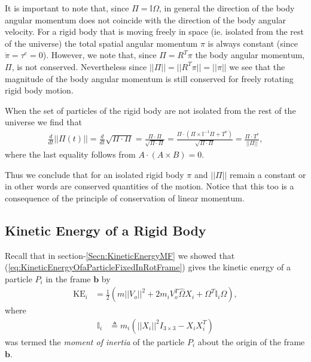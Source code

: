 \documentclass[graybox,envcountchap,sectrefs]{svmonoMuga}
\begin{document}
\begin{svgraybox}
It is important to note that, since $\Pi=\mathbb{I}\Omega$, in general the direction of the body angular momentum does not coincide with the direction of the body angular velocity.
For a rigid body that is moving freely in space (ie. isolated from the rest of the universe) the total spatial angular momentum $\pi$ is always constant (since $\dot{\pi}=\tau^e=0$). However, we note that, since $\Pi=R^T\pi$ the body angular momentum, $\Pi$, is not conserved. Nevertheless since $||\Pi||=||R^T\pi||=||\pi||$ we see that the magnitude of the body angular momentum is still conserved for freely rotating rigid body motion.
\end{svgraybox}
When the set of particles of the rigid body are not isolated from the rest of the universe we find that
\begin{align}\label{eq:RateMagPi}
\frac{d }{dt}||\Pi(t)||=\frac{d}{dt}\sqrt{\Pi \cdot \Pi}=\frac{{\Pi \cdot \dot{\Pi}}}{\sqrt{\Pi \cdot \Pi}}=\frac{{\Pi \cdot (\Pi\times \mathbb{I}^{-1}\Pi+T^e)}}
{\sqrt{\Pi \cdot \Pi}}=\frac{{\Pi \cdot T^e}}{||\Pi||},
\end{align}
where the last equality follows from
$
A \cdot (A \times B) = 0.
$










\begin{svgraybox}
Thus we conclude that for an isolated rigid body  $\pi$ and $||\Pi||$ remain a constant or in other words are conserved quantities of the motion. Notice that this too is a consequence of the principle of conservation of linear momentum.
\end{svgraybox}



\subsection{Kinetic Energy of a Rigid Body}
Recall that in section-\ref{Secn:KineticEnergyMF} we showed that (\ref{eq:KineticEnergyOfaParticleFixedInRotFrame}) gives the kinetic energy of a particle $P_i$ in the  frame $\mathbf{b}$  by
\begin{align*}
\mathrm{KE}_i&=\frac{1}{2} \left( m||V_o||^2+2m_iV_o^T\widehat{\Omega} X_i+\Omega^T\mathbb{I}_i\Omega
\right),
\end{align*}
where 
\begin{align*}
\mathbb{I}_i &\triangleq m_i\left(||X_i||^2I_{3\times 3} - X_iX_i^T\right)
\end{align*} 
was termed the \textit{moment of inertia} of the particle $P_i$ about the origin of the frame $\mathbf{b}$. 
\end{document}
